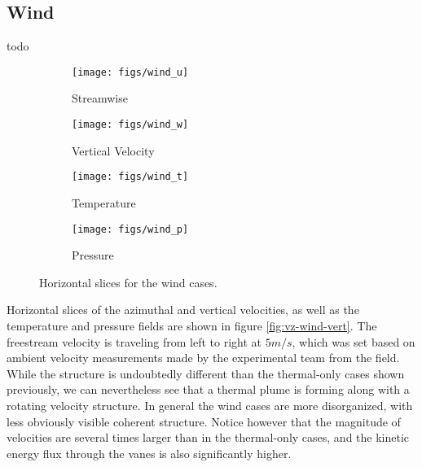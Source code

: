 \subsection{Wind}

todo

%
%
\begin{figure}[htb]

 \begin{subfigure}{.5\textwidth}
  \centering
  \texttt{[image: figs/wind\_u]}
  \caption{Streamwise}
  \label{fig:vt-wind}
 \end{subfigure}%
 \begin{subfigure}{.5\textwidth}
  \centering
  \texttt{[image: figs/wind\_w]}
  \caption{Vertical Velocity}
  \label{fig:vz-wind}
 \end{subfigure}%


 \begin{subfigure}{.5\textwidth}
  \centering
  \texttt{[image: figs/wind\_t]}
  \caption{Temperature}
  \label{fig:t-wind}
 \end{subfigure}%
 \begin{subfigure}{.5\textwidth}
  \centering
  \texttt{[image: figs/wind\_p]}
  \caption{Pressure}
  \label{fig:p-wind}
 \end{subfigure}%

 \caption{Horizontal slices for the wind cases.}
 \label{fig:wind-hor}
\end{figure}


Horizontal slices of the azimuthal and vertical velocities, as well as the 
temperature and pressure fields are shown in figure \ref{fig:vz-wind-vert}. The freestream velocity
is traveling from left to right at $5 m/s$, which was set based on ambient velocity measurements made by 
the experimental team from the field. 
While the structure is undoubtedly different than the thermal-only cases shown previously, 
we can nevertheless see that a thermal plume is forming along with a 
rotating velocity structure. In general the wind cases are more disorganized, with less obviously 
visible coherent structure. Notice however that the magnitude of velocities are several times larger than 
in the thermal-only cases, and the kinetic energy flux through the vanes is also significantly higher. 

